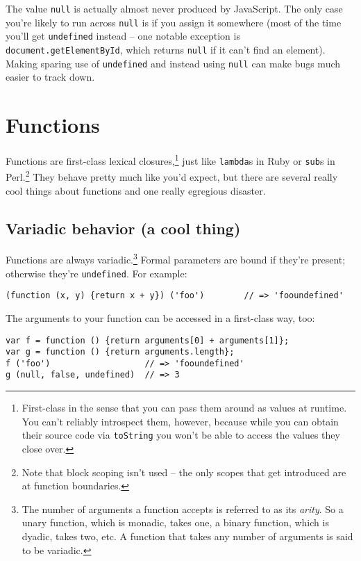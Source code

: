 \documentclass{article}
\begin{document}
  The value \verb|null| is actually almost never produced by JavaScript. The only case you're likely to run across \verb|null| is if you assign it somewhere (most of the time you'll get
  \verb|undefined| instead -- one notable exception is \verb|document.getElementById|, which returns \verb|null| if it can't find an element). Making sparing use of \verb|undefined| and
  instead using \verb|null| can make bugs much easier to track down.

\section {Functions}
  Functions are first-class lexical closures,\footnote{First-class in the sense that you can pass them around as values at runtime. You can't reliably introspect them, however, because while
  you can obtain their source code via {\tt toString} you won't be able to access the values they close over.} just like \verb|lambda|s in Ruby or \verb|sub|s in Perl.\footnote{Note that block
  scoping isn't used -- the only scopes that get introduced are at function boundaries.} They behave pretty much like you'd expect, but there are several really cool things about functions and
  one really egregious disaster.

\subsection {Variadic behavior (a cool thing)}
    Functions are always variadic.\footnote{The number of arguments a function accepts is referred to as its {\it arity}. So a unary function, which is monadic, takes one, a binary function,
    which is dyadic, takes two, etc. A function that takes any number of arguments is said to be variadic.} Formal parameters are bound if they're present; otherwise they're \verb|undefined|.
    For example:

\begin{verbatim}
(function (x, y) {return x + y}) ('foo')        // => 'fooundefined'
\end{verbatim}

    The arguments to your function can be accessed in a first-class way, too:

\begin{verbatim}
var f = function () {return arguments[0] + arguments[1]};
var g = function () {return arguments.length};
f ('foo')                   // => 'fooundefined'
g (null, false, undefined)  // => 3
\end{verbatim}
\end{document}
